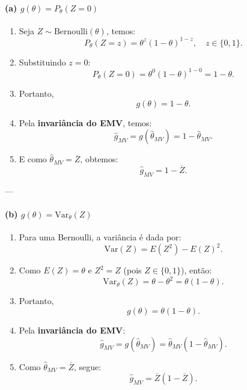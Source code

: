 

\paragraph{(a) \(g(\theta)=P_\theta(Z=0)\)}

\begin{enumerate}
  \item Seja \(Z \sim \mathrm{Bernoulli}(\theta)\), temos:
  \[
  P_\theta(Z=z)=\theta^z(1-\theta)^{1-z}, \quad z \in \{0,1\}.
  \]

  \item Substituindo \(z=0\):
  \[
  P_\theta(Z=0)=\theta^0(1-\theta)^{1-0}=1-\theta.
  \]

  \item Portanto,
  \[
  g(\theta)=1-\theta.
  \]

  \item Pela \textbf{invariância do EMV}, temos:
  \[
  \widehat g_{MV}=g(\widehat\theta_{MV})=1-\widehat\theta_{MV}.
  \]

  \item E como \(\widehat\theta_{MV}=\overline Z\), obtemos:
  \[
  \boxed{\widehat g_{MV}=1-\overline Z.}
  \]
\end{enumerate}


---

\paragraph{(b) \(g(\theta)=\mathrm{Var}_\theta(Z)\)}

\begin{enumerate}
  \item Para uma Bernoulli, a variância é dada por:
  \[
  \mathrm{Var}(Z)=E(Z^2)-E(Z)^2.
  \]

  \item Como \(E(Z)=\theta\) e \(Z^2=Z\) (pois \(Z\in\{0,1\}\)), então:
  \[
  \mathrm{Var}_\theta(Z)=\theta-\theta^2=\theta(1-\theta).
  \]

  \item Portanto,
  \[
  g(\theta)=\theta(1-\theta).
  \]

  \item Pela \textbf{invariância do EMV}:
  \[
  \widehat g_{MV}=g(\widehat\theta_{MV})
  =\widehat\theta_{MV}(1-\widehat\theta_{MV}).
  \]

  \item Como \(\widehat\theta_{MV}=\overline Z\), segue:
  \[
  \boxed{\widehat g_{MV}=\overline Z(1-\overline Z).}
  \]
\end{enumerate}


